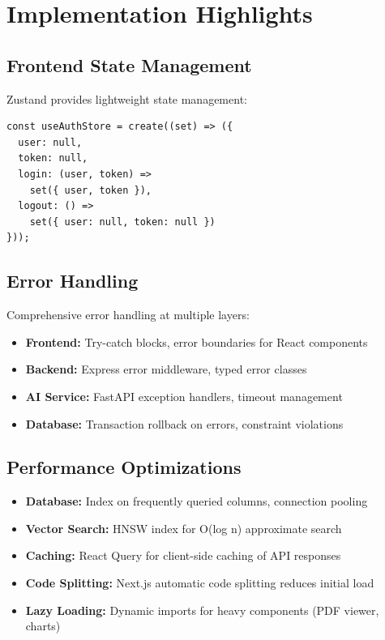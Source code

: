 \documentclass[12pt]{report}
\begin{document}
\section{Implementation Highlights}

\subsection{Frontend State Management}

Zustand provides lightweight state management:

\begin{verbatim}
const useAuthStore = create((set) => ({
  user: null,
  token: null,
  login: (user, token) => 
    set({ user, token }),
  logout: () => 
    set({ user: null, token: null })
}));
\end{verbatim}

\subsection{Error Handling}

Comprehensive error handling at multiple layers:

\begin{itemize}
    \item \textbf{Frontend:} Try-catch blocks, error boundaries for React components
    \item \textbf{Backend:} Express error middleware, typed error classes
    \item \textbf{AI Service:} FastAPI exception handlers, timeout management
    \item \textbf{Database:} Transaction rollback on errors, constraint violations
\end{itemize}

\subsection{Performance Optimizations}

\begin{itemize}
    \item \textbf{Database:} Index on frequently queried columns, connection pooling
    \item \textbf{Vector Search:} HNSW index for O(log n) approximate search
    \item \textbf{Caching:} React Query for client-side caching of API responses
    \item \textbf{Code Splitting:} Next.js automatic code splitting reduces initial load
    \item \textbf{Lazy Loading:} Dynamic imports for heavy components (PDF viewer, charts)
\end{itemize}
\end{document}
